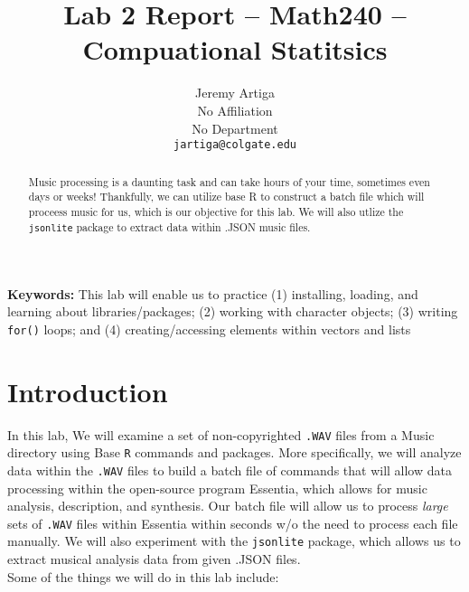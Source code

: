 \documentclass{article}\usepackage[]{graphicx}\usepackage[]{xcolor}
\begin{document}
\vspace{-1in}

\title{Lab 2 Report -- Math240 -- Compuational Statitsics}
\author{
  Jeremy Artiga \\
  No Affiliation \\
  No Department \\
  {\tt{jartiga@colgate.edu}}
}

\date{}

\maketitle

\begin{multicols}{2}
\begin{abstract}
Music processing is a daunting task and can take hours of your time, sometimes even days or weeks! Thankfully, we can utilize base R to construct a batch file which will proceess music for us, which is our objective for this lab. We will also utlize the \texttt{jsonlite} package to extract data within .JSON music files.
\end{abstract}

\textbf{Keywords:} This lab will enable us to practice (1) installing, loading, and learning
about libraries/packages; (2) working with character objects; (3) writing \texttt{for()} loops;
and (4) creating/accessing elements within vectors and lists

\section{Introduction}
In this lab, We will examine a set of non-copyrighted \texttt{.WAV} files
from a Music directory using Base \texttt{R} commands and packages. More specifically,
we will analyze data within the \texttt{.WAV} files to build a batch file of 
commands that will allow data processing within the open-source program Essentia,
which allows for music analysis, description, and synthesis. Our batch file will
allow us to process \emph{large} sets of \texttt{.WAV} files within Essentia within
seconds w/o the need to process each file manually. We will also experiment with the
\texttt{jsonlite} package, which allows us to extract musical analysis data from
given .JSON files. \\

\noindent Some of the things we will do in this lab include:


\end{multicols}
\end{document}
